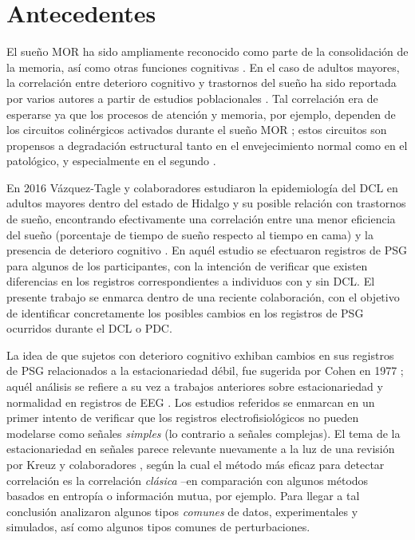 \section{Antecedentes}

El sueño MOR ha sido ampliamente reconocido como parte de la consolidación de la memoria, así como
otras funciones cognitivas 
\cite{Fishbein1971,Fishbein1977,Lucero1970,Pearlman1971,Pearlman1974,Smith1991}.
%
En el caso de adultos mayores, la correlación entre deterioro cognitivo y trastornos del sueño ha 
sido reportada por varios autores a partir de estudios poblacionales 
\cite{Amer13,Miyata13,Reid06,Potvin12}.
%
Tal correlación era de esperarse ya que los procesos de atención y memoria, por ejemplo, dependen de 
los circuitos colinérgicos activados durante el sueño MOR \cite{Braun1997}; estos circuitos son 
propensos a degradación estructural tanto en el envejecimiento normal como en el patológico,  y 
especialmente en el segundo \cite{Schliebs11}.

En 2016 Vázquez-Tagle y colaboradores estudiaron la epidemiología del DCL en adultos mayores dentro 
del estado de Hidalgo y su posible relación con trastornos de sueño, encontrando efectivamente una 
correlación entre una menor eficiencia del sueño (porcentaje de tiempo de sueño respecto al tiempo 
en cama) y la presencia de deterioro cognitivo \cite{VazquezTagle16}.
%
En aquél estudio se efectuaron registros de PSG para algunos de los participantes, con la intención 
de verificar que existen diferencias en los registros correspondientes a individuos con y sin DCL.
%
El presente trabajo se enmarca dentro de una reciente colaboración, con el objetivo de identificar concretamente
los posibles cambios en los registros de PSG  ocurridos durante el DCL o PDC.

La idea de que sujetos con deterioro cognitivo exhiban cambios en sus registros de PSG relacionados 
a la estacionariedad débil, fue sugerida por Cohen en 1977 \cite{Cohen77}; aquél análisis se 
refiere a su vez a trabajos anteriores sobre estacionariedad y normalidad en registros de EEG
\cite{McEwen75,Sugimoto78,Kawabata73}.
%
Los estudios referidos se enmarcan en un primer intento de verificar que los registros 
electrofisiológicos no pueden modelarse como señales \textit{simples} (lo contrario a señales 
complejas).
%
El tema de la estacionariedad en señales parece relevante nuevamente a la luz de una revisión
por Kreuz y colaboradores \cite{Kreuz07}, según la cual el método más eficaz para detectar 
correlación es la correlación \textit{clásica} --en comparación con algunos métodos basados en 
entropía o información mutua, por ejemplo. 
%
Para llegar a tal conclusión analizaron algunos tipos \textit{comunes} de datos, experimentales y 
simulados, así como algunos tipos comunes de perturbaciones.

